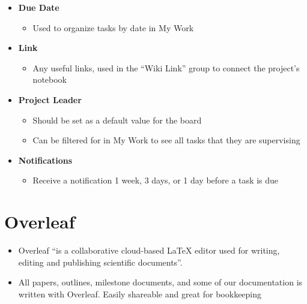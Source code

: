 \documentclass[
  letterpaper,
  DIV=11,
  numbers=noendperiod]{scrartcl}
\providecommand{\tightlist}{%
  \setlength{\itemsep}{0pt}\setlength{\parskip}{0pt}}\usepackage{longtable,booktabs,array}
\begin{document}
\begin{itemize}
\tightlist
\item
  {\textbf{Due Date} }

  \begin{itemize}
  \tightlist
  \item
    Used to organize tasks by date in My Work
  \end{itemize}
\item
  {\textbf{Link} }

  \begin{itemize}
  \tightlist
  \item
    Any useful links, used in the ``Wiki Link'' group to connect the
    project's notebook
  \end{itemize}
\item
  {\textbf{Project Leader} }

  \begin{itemize}
  \tightlist
  \item
    Should be set as a default value for the board
  \item
    Can be filtered for in My Work to see all tasks that they are
    supervising
  \end{itemize}
\item
  {\textbf{Notifications} }

  \begin{itemize}
  \tightlist
  \item
    Receive a notification 1 week, 3 days, or 1 day before a task is due
  \end{itemize}
\end{itemize}

\section{Overleaf}\label{overleaf}

\begin{itemize}
\tightlist
\item
  Overleaf ``is a collaborative cloud-based LaTeX editor used for
  writing, editing and publishing scientific documents''.
\item
  All papers, outlines, milestone documents, and some of our
  documentation is written with Overleaf. Easily shareable and great for
  bookkeeping
\end{itemize}
\end{document}

